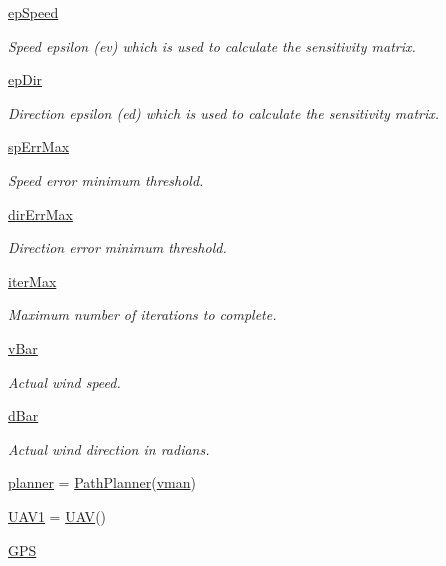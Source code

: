 \begin{DoxyCompactItemize}
\mbox{\hyperlink{namespace_greedy_path_a5d30db54ed4660997cad7a99db0ae3d5}{ep\+Speed}}
\begin{DoxyCompactList}\small\item\em Speed epsilon (ev) which is used to calculate the sensitivity matrix. \end{DoxyCompactList}\item 
\mbox{\hyperlink{namespace_greedy_path_a8e7645c081a51673f166a72dec83f08e}{ep\+Dir}}
\begin{DoxyCompactList}\small\item\em Direction epsilon (ed) which is used to calculate the sensitivity matrix. \end{DoxyCompactList}\item 
\mbox{\hyperlink{namespace_greedy_path_ac15dd3310629c8a8e6be44d3a182f356}{sp\+Err\+Max}}
\begin{DoxyCompactList}\small\item\em Speed error minimum threshold. \end{DoxyCompactList}\item 
\mbox{\hyperlink{namespace_greedy_path_a8ea64d8438aecf56abe3d63433b8a3ea}{dir\+Err\+Max}}
\begin{DoxyCompactList}\small\item\em Direction error minimum threshold. \end{DoxyCompactList}\item 
\mbox{\hyperlink{namespace_greedy_path_a5b46b8310be6f398493f6f89ea93c90f}{iter\+Max}}
\begin{DoxyCompactList}\small\item\em Maximum number of iterations to complete. \end{DoxyCompactList}\item 
\mbox{\hyperlink{namespace_greedy_path_a03451064d5350073da9cb253f7684576}{v\+Bar}}
\begin{DoxyCompactList}\small\item\em Actual wind speed. \end{DoxyCompactList}\item 
\mbox{\hyperlink{namespace_greedy_path_a2dca3109ed198652e8fccb34ec8cf5cc}{d\+Bar}}
\begin{DoxyCompactList}\small\item\em Actual wind direction in radians. \end{DoxyCompactList}\item 
\mbox{\hyperlink{namespace_greedy_path_a48d2bf39a0cc9f5e87640f060e67bd1c}{planner}} = \mbox{\hyperlink{classpath_plan_1_1_path_planner}{Path\+Planner}}(\mbox{\hyperlink{namespace_greedy_path_a0b686e13d9e46e185e611dc0b5d92e8f}{vman}})
\item 
\mbox{\hyperlink{namespace_greedy_path_a133ae9f113d9f694f9506cb6bad87f91}{U\+A\+V1}} = \mbox{\hyperlink{classpath_plan_1_1_u_a_v}{U\+AV}}()
\item 
\mbox{\hyperlink{namespace_greedy_path_a789d06703c87f9f5dca025c8695a1857}{G\+PS}}
\end{DoxyCompactItemize}


